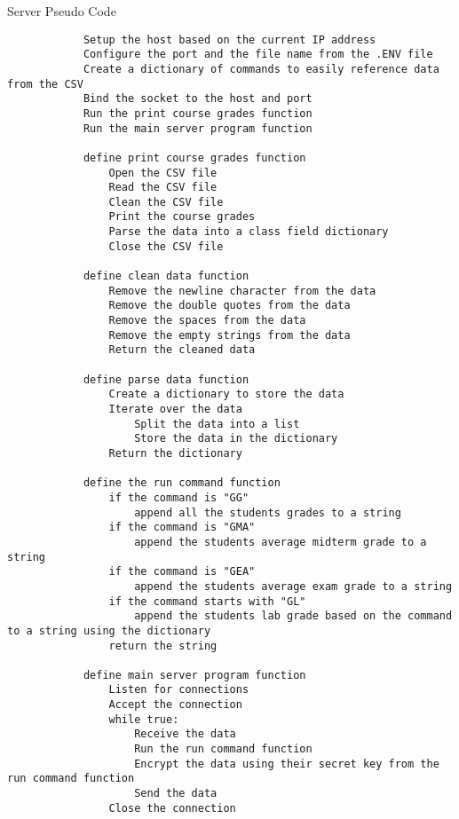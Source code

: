 \documentclass[titlepage]{article}
\begin{document}
    \begin{section}{Server Pseudo Code}
        \begin{verbatim}
            Setup the host based on the current IP address
            Configure the port and the file name from the .ENV file
            Create a dictionary of commands to easily reference data from the CSV
            Bind the socket to the host and port
            Run the print course grades function
            Run the main server program function

            define print course grades function
                Open the CSV file
                Read the CSV file
                Clean the CSV file
                Print the course grades
                Parse the data into a class field dictionary
                Close the CSV file

            define clean data function
                Remove the newline character from the data
                Remove the double quotes from the data
                Remove the spaces from the data
                Remove the empty strings from the data
                Return the cleaned data

            define parse data function
                Create a dictionary to store the data
                Iterate over the data
                    Split the data into a list
                    Store the data in the dictionary
                Return the dictionary

            define the run command function
                if the command is "GG"
                    append all the students grades to a string
                if the command is "GMA"
                    append the students average midterm grade to a string
                if the command is "GEA"
                    append the students average exam grade to a string
                if the command starts with "GL"
                    append the students lab grade based on the command to a string using the dictionary
                return the string

            define main server program function
                Listen for connections
                Accept the connection
                while true:
                    Receive the data
                    Run the run command function
                    Encrypt the data using their secret key from the run command function
                    Send the data
                Close the connection
        \end{verbatim}
    \end{section}
\end{document}
